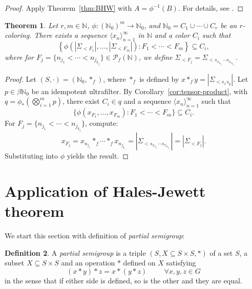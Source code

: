 \documentclass[12pt]{amsart}
\theoremstyle{plain}
\newtheorem{theorem}{Theorem}[section]
\theoremstyle{definition}
\newtheorem{definition}[theorem]{Definition}
\theoremstyle{remark}
\numberwithin{equation}{section}
\begin{document}
\begin{proof}
  Apply Theorem~\ref{thm:BHW} with $A = \phi^{-1}(B)$. For details, see \cite[Corollary 5.4]{Nasso22}.
\end{proof}




\begin{theorem}\label{thm:main}
  Let $r, m \in \mathbb{N}$, $\phi: (\mathbb{N}_0)^m \to \mathbb{N}_0$, and $\mathbb{N}_0 = C_1 \cup \cdots \cup C_r$ be an $r$-coloring. There exists a sequence $\langle x_n \rangle_{n=1}^\infty$ in $\mathbb{N}$ and a color $C_i$ such that 
  \[
   \left\{\phi\left(|\Sigma_{<F_1}|, \dots, |\Sigma_{<F_m}| \right) : F_1 < \cdots < F_m \right\} \subseteq C_i,\]
  where for $F_j = \{n_{j_1} < \cdots < n_{j_{k_j}}\} \in \mathcal{P}_f(\mathbb{N})$, we define $\Sigma_{<F_j} = \Sigma_{<s_{x_{n_{j_1}}} \cdots s_{x_{n_{j_{k_j}}}}}$.
\end{theorem}

\begin{proof}
  Let $(S, \cdot) = (\mathbb{N}_0, \ast_f)$, where $\ast_f$ is defined by $x \ast_f y = |\Sigma_{<s_x s_y}|$. Let $p \in \beta \mathbb{N}_0$ be an idempotent ultrafilter. By Corollary~\ref{cor:tensor-product}, with $q = \phi_*\left(\bigotimes_{i=1}^m p\right)$, there exist $C_i \in q$ and a sequence $\langle x_n \rangle_{n=1}^{\infty}$ such that  
  \[
    \{\phi(x_{F_1}, \dots, x_{F_m}) : F_1 < \cdots < F_m\} \subseteq C_i.
  \]
  For $F_j = \{n_{j_1} < \cdots < n_{j_{k_j}}\}$, compute:
  \[
    x_{F_j} = x_{n_{j_1}} \ast_f \cdots \ast_f x_{n_{j_{k_j}}} = \left|\Sigma_{<s_{x_{n_{j_1}}} \cdots s_{x_{n_{j_{k_j}}}}}\right| = |\Sigma_{<F_j}|.
  \]
  Substituting into $\phi$ yields the result.\end{proof}

\section{Application of Hales-Jewett theorem}
We start this section with definition of \textit{partial semigroup}:

\begin{definition}
A \emph{partial semigroup} is a triple $(S, X \subseteq S \times S, \ast)$ of a set $S$, a subset $X \subseteq S \times S$ and an operation  $\ast$ 
defined on $X$ satisfying
%
\[
(x \ast y) \ast z = x \ast (y \ast z)\hspace{1cm} \forall x,y,z \in G
\]
%
 in the sense that if either side 
is defined, so is the other and they are equal.


\end{definition}
\end{document}
